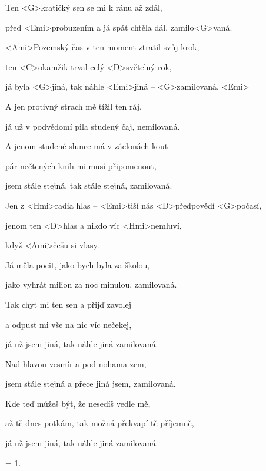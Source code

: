 

\zs
Ten <G>kratičký sen se mi k ránu až zdál,

před <Emi>probuzením a já spát chtěla dál, zamilo<G>vaná.

<Ami>Pozemský čas v ten moment ztratil svůj krok,

ten <C>okamžik trval celý <D>světelný rok,

já byla <G>jiná, tak náhle <Emi>jiná -- <G>zamilovaná. <Emi>
\ks

\zs
A jen protivný strach mě tížil ten ráj,

já už v podvědomí pila studený čaj, nemilovaná.

A jenom studené slunce má v záclonách kout

pár nečtených knih mi musí připomenout,

jsem stále stejná, tak stále stejná, zamilovaná.
\ks

\zr
Jen z <Hmi>radia hlas -- <Emi>tiší nás <D>předpovědí <G>počasí,

jenom ten <D>hlas a nikdo víc <Hmi>nemluví,

když <Ami>češu si vlasy.
\kr   

\zs
Já měla pocit, jako bych byla za školou,

jako vyhrát milion za noc minulou, zamilovaná. 

Tak chyť mi ten sen a přijď zavolej

a odpust mi vše na nic víc nečekej,

já už jsem jiná, tak náhle jiná zamilovaná.
\ks

\zs   
Nad hlavou vesmír a pod nohama zem,

jsem stále stejná a přece jiná jsem, zamilovaná.

Kde teď můžeš být, že nesedíš vedle mě,

až tě dnes potkám, tak možná překvapí tě příjemně, 

já už jsem jiná, tak náhle jiná zamilovaná.
\ks

\zr
\kr

\zs
= 1.
\ks

\kp
